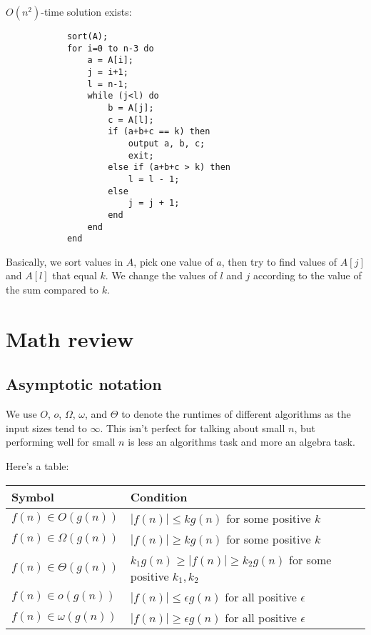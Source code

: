         $O(n^2)$-time solution exists:
        \begin{verbatim}
            sort(A);
            for i=0 to n-3 do
                a = A[i];
                j = i+1;
                l = n-1;
                while (j<l) do
                    b = A[j];
                    c = A[l];
                    if (a+b+c == k) then
                        output a, b, c;
                        exit;
                    else if (a+b+c > k) then
                        l = l - 1;
                    else
                        j = j + 1;
                    end
                end
            end
        \end{verbatim}
        Basically, we sort values in $A$, pick one value of $a$, then try to
        find values of $A[j]$ and $A[l]$ that equal $k$. We change the values
        of $l$ and $j$ according to the value of the sum compared to $k$.

    \section{Math review}
        \subsection{Asymptotic notation}
            We use $O$, $o$, $\Omega$, $\omega$, and $\Theta$ to denote the
            runtimes of different algorithms as the input sizes tend to
            $\infty$. This isn't perfect for talking about small $n$, but
            performing well for small $n$ is less an algorithms task and more an
            algebra task.

            Here's a table:
            \begin{table}[h]
                \centering
                \begin{tabular}{ | l || l |}
                    \hline
                    Symbol & Condition \\ \hline
                    $f(n) \in O(g(n))$       & $|f(n)| \le k g(n)$ for some positive $k$ \\ \hline
                    $f(n) \in \Omega(g(n))$  & $|f(n)| \ge k g(n)$ for some positive $k$ \\ \hline
                    $f(n) \in \Theta(g(n))$  & $k_1 g(n) \ge |f(n)| \ge k_2 g(n)$ for some positive $k_1, k_2$ \\ \hline
                    $f(n) \in o(g(n))$       & $|f(n)| \le \epsilon g(n) $ for all positive $\epsilon$ \\ \hline
                    $f(n) \in \omega (g(n))$ & $|f(n)| \ge \epsilon g(n) $ for all positive $\epsilon$ \\ \hline
                \end{tabular}
            \end{table}

